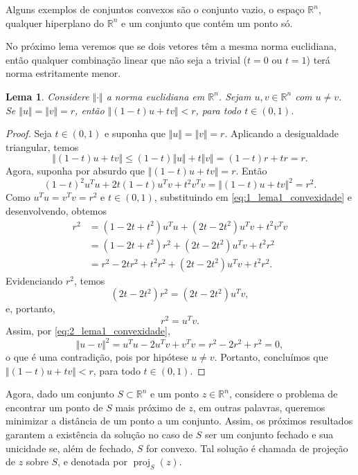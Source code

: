 \documentclass[12pt,a4paper]{scrartcl}
\DeclareMathOperator{\proj}{proj}
\def\RR{\mathds{R}}
\newtheorem{lema}{Lema}
\theoremstyle{definition}%
\begin{document}
Alguns exemplos de conjuntos convexos são o conjunto vazio, o espaço $\RR^{n}$, qualquer hiperplano do $\RR^{n}$ e um conjunto que contém um ponto só. 

No próximo lema veremos que se dois vetores têm a mesma norma euclidiana, então qualquer combinação linear que não seja a trivial ($t=0$ ou $t=1$) terá norma estritamente menor.

\begin{lema} \label{lema:1_convexidade}
Considere $\Vert \cdot \Vert$ a norma euclidiana em $\RR^{n}$. Sejam $u,v \in \RR^{n}$ com $u\neq v$. Se $\Vert u \Vert = \Vert v \Vert = r$, então $\Vert (1-t)u + tv \Vert < r$, para todo $t \in (0,1)$.
\end{lema}

\begin{proof}
Seja $t \in (0,1)$ e suponha que $\Vert u \Vert = \Vert v \Vert = r$. Aplicando a desigualdade triangular, temos
\[
\Vert (1-t)u + tv \Vert \leq (1-t)\Vert u \Vert + t\Vert v \Vert = (1-t)r + tr = r.
\]
Agora, suponha por absurdo que $\Vert (1-t)u + tv \Vert = r$. Então
\[ \label{eq:1_lema1_convexidade}
(1-t)^{2} u^{T}u + 2t(1-t)u^{T}v + t^{2}v^{T}v = \Vert (1-t)u + tv \Vert^{2} = r^{2}.
\]
Como $u^{T}u = v^{T}v = r^{2}$ e $t \in (0,1)$, substituindo em \eqref{eq:1_lema1_convexidade} e desenvolvendo, obtemos 
\begin{align}
r^{2} &= (1-2t+t^{2}) u^{T}u + (2t-2t^{2})u^{T}v + t^{2}v^{T}v \\
&= (1-2t+t^{2}) r^{2} + (2t-2t^{2})u^{T}v + t^{2}r^{2} \\
&= r^{2} - 2tr^{2} + t^{2}r^{2} + (2t-2t^{2})u^{T}v + t^{2}r^{2} .
\end{align}
Evidenciando $r^{2}$, temos
\[ 
(2t-2t^{2})r^{2} = (2t-2t^{2})u^{T}v,
\]
e, portanto,
\[ \label{eq:2_lema1_convexidade}
r^{2} = u^{T}v.
\]
Assim, por \eqref{eq:2_lema1_convexidade},
\[
\Vert u-v \Vert^{2} = u^{T}u - 2u^{T}v + v^{T}v = r^{2} - 2r^{2} + r^{2} = 0,
\]
o que é uma contradição, pois por hipótese $u \neq v$. 
Portanto, concluímos que $\Vert (1-t)u + tv \Vert < r$, para todo $t \in (0,1)$.
\end{proof}

Agora, dado um conjunto $S \subset \RR^{n}$ e um ponto $z \in \RR^{n}$, considere o problema de encontrar um ponto de $S$ mais próximo de $z$, em outras palavras, queremos minimizar a distância de um ponto a um conjunto. Assim, os próximos resultados garantem a existência da solução no caso de $S$ ser um conjunto fechado e sua unicidade se, além de fechado, $S$ for convexo. Tal solução é chamada de projeção de $z$ sobre $S$, e denotada por $\proj_{S} (z)$. 
\end{document}
